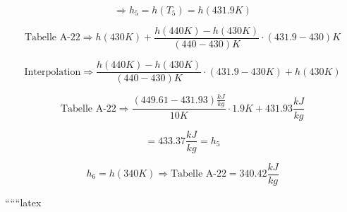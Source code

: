 \[
\Rightarrow h_5 = h(T_5) = h(431.9K)
\]

\[
\text{Tabelle A-22} \Rightarrow h(430K) + \frac{h(440K) - h(430K)}{(440 - 430)K} \cdot (431.9 - 430)K
\]

\[
\text{Interpolation} \Rightarrow \frac{h(440K) - h(430K)}{(440 - 430)K} \cdot (431.9 - 430K) + h(430K)
\]

\[
\text{Tabelle A-22} \Rightarrow \frac{(449.61 - 431.93) \frac{kJ}{kg}}{10K} \cdot 1.9K + 431.93 \frac{kJ}{kg}
\]

\[
= 433.37 \frac{kJ}{kg} = h_5
\]

\[
h_6 = h(340K) \Rightarrow \text{Tabelle A-22} = 340.42 \frac{kJ}{kg}
\]

``````latex


